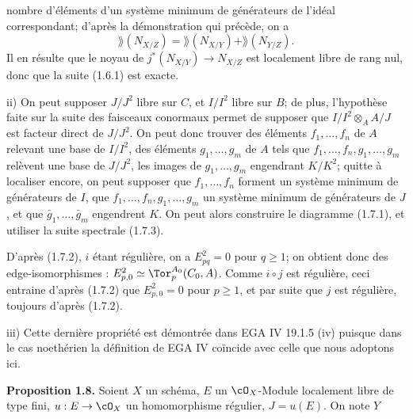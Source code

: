 nombre d'éléments d'un système minimum de générateurs de l'idéal correspondant; d'après la démonstration qui précède, on a
\[
 \rang(N_{X/Z})=\rang(N_{X/Y})+\rang(N_{Y/Z}).
\]
Il en résulte que le noyau de $j^*(N_{X/Y})\longrightarrow N_{X/Z}$ est localement libre de rang nul, donc que la suite (1.6.1) est exacte.

ii) On peut supposer $J/J^2$ libre sur $C$, et $I/I^2$ libre sur $B$; de plus, l'hypothèse faite sur la suite des faisceaux conormaux permet de supposer que $I/I^2\otimes_A A/J$ est facteur direct de $J/J^2$. On peut donc trouver des éléments $f_1,\ldots,f_n$ de $A$ relevant une base de $I/I^2$, des éléments $g_1,\ldots,g_m$ de $A$ tels que $f_1,\ldots,f_n,g_1,\ldots,g_m$ relèvent une base de $J/J^2$, les images de $g_1,\ldots,g_m$ engendrant $K/K^2$; quitte à localiser encore, on peut supposer que $f_1,\ldots,f_n$ forment un système minimum de générateurs de $I$, que $f_1,\ldots,f_n,g_1,\ldots,g_m$ un système minimum de générateurs de $J$, et que $\bar g_1,\ldots,\bar g_m$ engendrent $K$. On peut alors construire le diagramme (1.7.1), et utiliser la suite spectrale (1.7.3).

D'après (1.7.2), $i$ étant régulière, on a $E^2_{pq}=0$ pour $q\geq1$; on obtient donc des edge-isomorphismes : $E^2_{p,0}\simeq\Tor_p^{A_0}(C_0,A)$. Comme $i\circ j$ est régulière, ceci entraine d'après (1.7.2) que $E^2_{p,0}=0$ pour $p\geq1$, et par suite que $j$ est régulière, toujours d'après (1.7.2).

iii) Cette dernière propriété est démontrée dans EGA IV 19.1.5 (iv) puisque dans le cas noethérien la définition de EGA IV coïncide avec celle que nous adoptons ici.

\textbf{Proposition 1.8.} Soient \(X\) un schéma, \(E\) un \(\cO_X\)-Module localement libre de type fini, \(u:E\to\cO_X\) un homomorphisme régulier, \(J=u(E)\). On note \(Y\)
